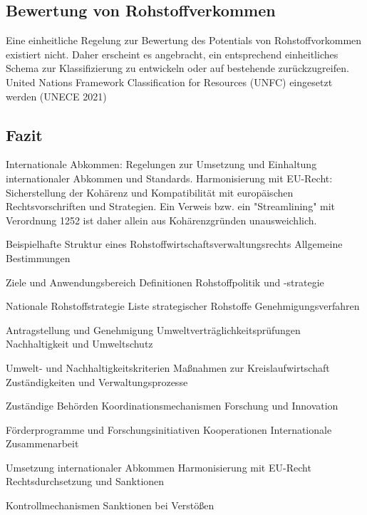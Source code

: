 \documentclass[12pt,a4paper,oneside]{book} %
\begin{document}
\subsection{Bewertung von Rohstoffverkommen}
Eine einheitliche Regelung zur Bewertung des Potentials von Rohstoffvorkommen existiert nicht. Daher erscheint es angebracht, ein entsprechend einheitliches Schema zur Klassifizierung zu entwickeln oder auf bestehende zurückzugreifen.
United Nations Framework Classification for Resources (UNFC) eingesetzt werden (UNECE 2021)

\subsection{Fazit}



Internationale Abkommen: Regelungen zur Umsetzung und Einhaltung internationaler Abkommen und Standards.
Harmonisierung mit EU-Recht: Sicherstellung der Kohärenz und Kompatibilität mit europäischen Rechtsvorschriften und Strategien.
Ein Verweis bzw. ein "Streamlining" mit Verordnung 1252 ist daher allein aus Kohärenzgründen unausweichlich.

Beispielhafte Struktur eines Rohstoffwirtschaftsverwaltungsrechts
Allgemeine Bestimmungen

Ziele und Anwendungsbereich
Definitionen
Rohstoffpolitik und -strategie

Nationale Rohstoffstrategie
Liste strategischer Rohstoffe
Genehmigungsverfahren

Antragstellung und Genehmigung
Umweltverträglichkeitsprüfungen
Nachhaltigkeit und Umweltschutz

Umwelt- und Nachhaltigkeitskriterien
Maßnahmen zur Kreislaufwirtschaft
Zuständigkeiten und Verwaltungsprozesse

Zuständige Behörden
Koordinationsmechanismen
Forschung und Innovation

Förderprogramme und Forschungsinitiativen
Kooperationen
Internationale Zusammenarbeit

Umsetzung internationaler Abkommen
Harmonisierung mit EU-Recht
Rechtsdurchsetzung und Sanktionen

Kontrollmechanismen
Sanktionen bei Verstößen
\end{document}
